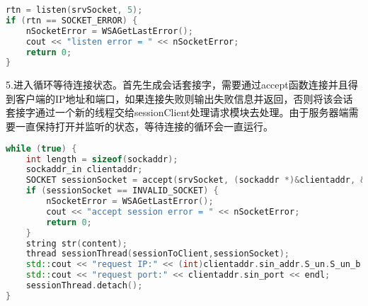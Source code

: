 \begin{lstlisting}[language=c++]
rtn = listen(srvSocket, 5);
if (rtn == SOCKET_ERROR) {
	nSocketError = WSAGetLastError();
	cout << "listen error = " << nSocketError;
	return 0;
}
\end{lstlisting}
\hspace*{2em}5.进入循环等待连接状态。首先生成会话套接字，需要通过accept函数连接并且得到客户端的IP地址和端口，如果连接失败则输出失败信息并返回，否则将该会话套接字通过一个新的线程交给sessionClient处理请求模块去处理。由于服务器端需要一直保持打开并监听的状态，等待连接的循环会一直运行。
\begin{lstlisting}[language=c++]
while (true) {
	int length = sizeof(sockaddr);
	sockaddr_in clientaddr;
	SOCKET sessionSocket = accept(srvSocket, (sockaddr *)&clientaddr, &length);
	if (sessionSocket == INVALID_SOCKET) {
		nSocketError = WSAGetLastError();
		cout << "accept session error = " << nSocketError;
		return 0;
	}
	string str(content);
	thread sessionThread(sessionToClient,sessionSocket);
	std::cout << "request IP:" << (int)clientaddr.sin_addr.S_un.S_un_b.s_b1 << "." << (int)clientaddr.sin_addr.S_un.S_un_b.s_b2 << "." << (int)clientaddr.sin_addr.S_un.S_un_b.s_b3 << "." << (int)clientaddr.sin_addr.S_un.S_un_b.s_b4<<endl;
	std::cout << "request port:" << clientaddr.sin_port << endl;
	sessionThread.detach();
}
\end{lstlisting}
